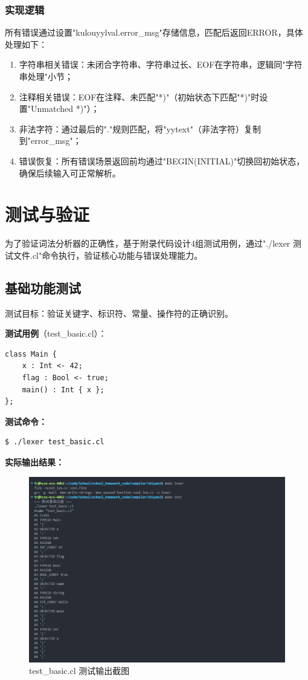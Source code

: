 \documentclass[twocolumn]{article}
\begin{document}
\subsubsection{实现逻辑}
所有错误通过设置"kulouyylval.error\_msg"存储信息，匹配后返回ERROR，具体处理如下：
\begin{enumerate}
    \item 字符串相关错误：未闭合字符串、字符串过长、EOF在字符串，逻辑同"字符串处理"小节；
    \item 注释相关错误：EOF在注释、未匹配"*)"（初始状态下匹配"*)"时设置"Unmatched *)"）；
    \item 非法字符：通过最后的"."规则匹配，将"yytext"（非法字符）复制到"error\_msg"；
    \item 错误恢复：所有错误场景返回前均通过"BEGIN(INITIAL)"切换回初始状态，确保后续输入可正常解析。
\end{enumerate}

\section{测试与验证}
为了验证词法分析器的正确性，基于附录代码设计4组测试用例，通过"./lexer 测试文件.cl"命令执行，验证核心功能与错误处理能力。

\subsection{基础功能测试}

测试目标：验证关键字、标识符、常量、操作符的正确识别。

\textbf{测试用例}（test\_basic.cl）：
\begin{lstlisting}[language=cool, caption={基础功能测试}]
class Main {
    x : Int <- 42;
    flag : Bool <- true;
    main() : Int { x };
};
\end{lstlisting}

\textbf{测试命令：}
\begin{verbatim}
$ ./lexer test_basic.cl
\end{verbatim}

\textbf{实际输出结果：}
\begin{figure}[H]
    \centering
    \includegraphics[width=\linewidth]{test_basic_output.png}  %
    \caption{test\_basic.cl 测试输出截图}  %
\end{figure}
\end{document}
